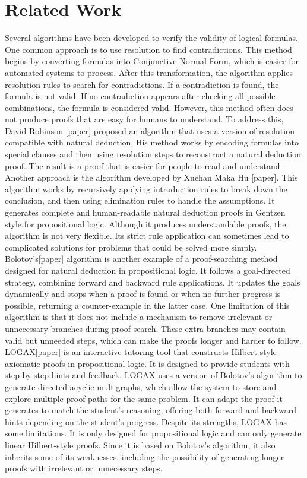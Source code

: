 \documentclass[runningheads]{llncs}
\begin{document}
\section{Related Work}
Several algorithms have been developed to verify the validity of logical formulas. One common approach is to use resolution to find contradictions. This method begins by converting formulas into Conjunctive Normal Form, which is easier for automated systems to process. After this transformation, the algorithm applies resolution rules to search for contradictions. If a contradiction is found, the formula is not valid. If no contradiction appears after checking all possible combinations, the formula is considered valid. However, this method often does not produce proofs that are easy for humans to understand.
To address this, David Robinson [paper] proposed an algorithm that uses a version of resolution compatible with natural deduction. His method works by encoding formulas into special clauses and then using resolution steps to reconstruct a natural deduction proof. The result is a proof that is easier for people to read and understand.
Another approach is the algorithm developed by Xuehan Maka Hu [paper]. This algorithm works by recursively applying introduction rules to break down the conclusion, and then using elimination rules to handle the assumptions. It generates complete and human-readable natural deduction proofs in Gentzen style for propositional logic. Although it produces understandable proofs, the algorithm is not very flexible. Its strict rule application can sometimes lead to complicated solutions for problems that could be solved more simply.
Bolotov's[paper] algorithm is another example of a proof-searching method designed for natural deduction in propositional logic. It follows a goal-directed strategy, combining forward and backward rule applications. It updates the goals dynamically and stops when a proof is found or when no further progress is possible, returning a counter-example in the latter case. One limitation of this algorithm is that it does not include a mechanism to remove irrelevant or unnecessary branches during proof search. These extra branches may contain valid but unneeded steps, which can make the proofs longer and harder to follow.
LOGAX[paper] is an interactive tutoring tool that constructs Hilbert-style axiomatic proofs in propositional logic. It is designed to provide students with step-by-step hints and feedback. LOGAX uses a version of Bolotov's algorithm to generate directed acyclic multigraphs, which allow the system to store and explore multiple proof paths for the same problem. It can adapt the proof it generates to match the student's reasoning, offering both forward and backward hints depending on the student's progress. Despite its strengths, LOGAX has some limitations. It is only designed for propositional logic and can only generate linear Hilbert-style proofs. Since it is based on Bolotov's algorithm, it also inherits some of its weaknesses, including the possibility of generating longer proofs with irrelevant or unnecessary steps.
\end{document}
